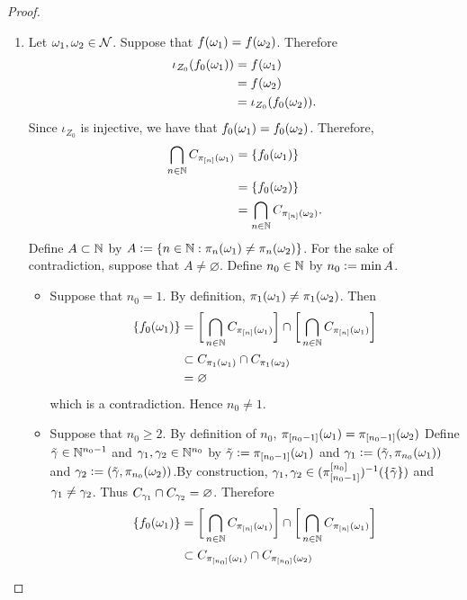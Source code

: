 \documentclass{book}
\begin{document}
\begin{proof}
\begin{enumerate}
			\item Let $\omega_1, \omega_2 \in \mathcal{N}$. Suppose that $f(\omega_1) = f(\omega_2)$. Therefore  
			\begin{align*}
				\iota_{Z_0} (f_0(\omega_1)) 
				& = f(\omega_1) \\
				& = f(\omega_2) \\
				& = \iota_{Z_0} (f_0(\omega_2)).
			\end{align*}
			Since $\iota_{Z_0}$ is injective, we have that $f_0(\omega_1) = f_0(\omega_2)$. Therefore, 
			\begin{align*}
				\bigcap\limits_{n \in \mathbb{N}} C_{\pi_{[n]}(\omega_1)} 
				& = \{f_0(\omega_1)\} \\
				& = \{f_0(\omega_2)\} \\
				& = \bigcap\limits_{n \in \mathbb{N}} C_{\pi_{[n]}(\omega_2)}.
			\end{align*}  
			Define $A \subset \mathbb{N}$ by $A \vcentcolon= \{n \in \mathbb{N}: \pi_n(\omega_1) \neq \pi_n(\omega_2)\}$. For the sake of contradiction, suppose that $A \neq \varnothing$. Define $n_0 \in \mathbb{N}$ by $n_0 \vcentcolon= \min A$. 
			\begin{itemize}
				\item Suppose that $n_0 = 1$. By definition, $\pi_1(\omega_1) \neq \pi_1(\omega_2)$. Then 
				\begin{align*}
					\{f_0(\omega_1)\} 
					& = \bigg[ \bigcap\limits_{n \in \mathbb{N}} C_{\pi_{[n]}(\omega_1)} \bigg]  \cap \bigg[ \bigcap\limits_{n \in \mathbb{N}} C_{\pi_{[n]}(\omega_1)} \bigg] \\
					& \subset C_{\pi_1(\omega_1)} \cap C_{\pi_1(\omega_2)} \\
					& = \varnothing
				\end{align*}
				which is a contradiction. Hence $n_0 \neq 1$. 
				\item Suppose that $n_0 \geq 2$. By definition of $n_0$, $\pi_{[n_0-1]}(\omega_1) = \pi_{[n_0-1]}(\omega_2)$ Define $\tilde{\gamma} \in \mathbb{N}^{n_0-1}$ and $\gamma_1, \gamma_2 \in \mathbb{N}^{n_0}$ by $\tilde{\gamma} \vcentcolon= \pi_{[n_0-1]}(\omega_1)$ and $\gamma_1 \vcentcolon= (\tilde{\gamma}, \pi_{n_0}(\omega_1))$ and $\gamma_2 \vcentcolon= (\tilde{\gamma}, \pi_{n_0}(\omega_2))$.By construction, $\gamma_1, \gamma_2 \in (\pi^{[n_0]}_{[n_0-1]})^{-1}(\{\tilde{\gamma}\})$ and $\gamma_1 \ne \gamma_2$. Thus $C_{\gamma_1} \cap C_{\gamma_2} = \varnothing$. Therefore  
				\begin{align*}
					\{f_0(\om_1)\} 
					& = \bigg[ \bigcap\limits_{n \in \N} C_{\pi_{[n]}(\om_1)} \bigg]  \cap \bigg[ \bigcap\limits_{n \in \N} C_{\pi_{[n]}(\om_1)} \bigg] \\
					& \subset C_{\pi_{[n_0]}(\om_1)} \cap C_{\pi_{[n_0]}(\om_2)} \\

\end{align*}
\end{itemize}
\end{enumerate}
\end{proof}
\end{document}
